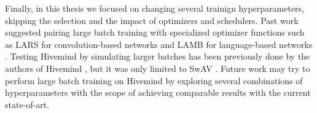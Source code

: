 Finally, in this thesis we focused on changing several trainign hyperparameters, skipping the selection and the impact of optimizers and schedulers.
Past work suggested pairing large batch training with specialized optimizer functions such as LARS for convolution-based networks \cite{you2017scaling, DBLP:journals/corr/KeskarMNST16} and LAMB for language-based networks \cite{DBLP:journals/corr/abs-1904-00962}.
Testing Hivemind by simulating larger batches has been previously done by the authors of Hivemind \cite{DBLP:journals/corr/abs-2106-10207}, but it was only limited to SwAV \cite{DBLP:journals/corr/abs-2006-09882}.
Future work may try to perform large batch training on Hivemind by exploring several combinations of hyperparameters with the scope of achieving comparable results with the current state-of-art.
